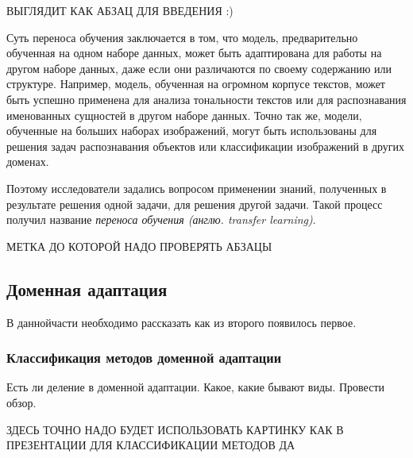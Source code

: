 ВЫГЛЯДИТ КАК АБЗАЦ ДЛЯ ВВЕДЕНИЯ :) 

Суть переноса обучения заключается в том, что модель, предварительно обученная на одном наборе данных, может быть адаптирована для работы на другом наборе данных, даже если они различаются по своему содержанию или структуре. Например, модель, обученная на огромном корпусе текстов, может быть успешно применена для анализа тональности текстов или для распознавания именованных сущностей в другом наборе данных. Точно так же, модели, обученные на больших наборах изображений, могут быть использованы для решения задач распознавания объектов или классификации изображений в других доменах.

Поэтому исследователи задались вопросом применении знаний, полученных в результате решения одной задачи, для решения другой задачи. Такой процесс получил название \textit{переноса обучения (англю. transfer learning)}.  

МЕТКА ДО КОТОРОЙ НАДО ПРОВЕРЯТЬ АБЗАЦЫ

\subsection{Доменная адаптация}

В даннойчасти необходимо рассказать как из второго появилось первое.

\subsubsection{Классификация методов доменной адаптации}

Есть ли деление в доменной адаптации. Какое, какие бывают виды. Провести обзор.

ЗДЕСЬ ТОЧНО НАДО БУДЕТ ИСПОЛЬЗОВАТЬ КАРТИНКУ КАК В ПРЕЗЕНТАЦИИ ДЛЯ КЛАССИФИКАЦИИ МЕТОДОВ ДА

\newpage